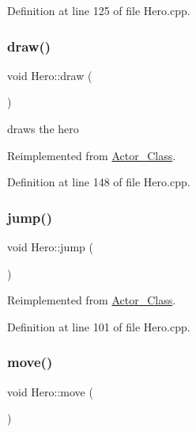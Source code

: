 Definition at line 125 of file Hero.\+cpp.

\hypertarget{class_hero_abc9f2dece1e3757ba2b315a332f995c2}{}\label{class_hero_abc9f2dece1e3757ba2b315a332f995c2} 
\subsubsection{\texorpdfstring{draw()}{draw()}}
{\footnotesize\ttfamily void Hero\+::draw (\begin{DoxyParamCaption}{ }\end{DoxyParamCaption})\hspace{0.3cm}{\ttfamily [virtual]}}



draws the hero 



Reimplemented from \hyperlink{class_actor___class_ac49cd62be76b4b950ecbe155413f1b64}{Actor\+\_\+\+Class}.



Definition at line 148 of file Hero.\+cpp.

\hypertarget{class_hero_a1bee38d9164cf1ecda512cc24e81b171}{}\label{class_hero_a1bee38d9164cf1ecda512cc24e81b171} 
\subsubsection{\texorpdfstring{jump()}{jump()}}
{\footnotesize\ttfamily void Hero\+::jump (\begin{DoxyParamCaption}{ }\end{DoxyParamCaption})\hspace{0.3cm}{\ttfamily [virtual]}}



Reimplemented from \hyperlink{class_actor___class_ab33216a3ce0c856bdc16231c71ae35c2}{Actor\+\_\+\+Class}.



Definition at line 101 of file Hero.\+cpp.

\hypertarget{class_hero_a24e136aeddd49d1a7d0c068079fbab7e}{}\label{class_hero_a24e136aeddd49d1a7d0c068079fbab7e} 
\subsubsection{\texorpdfstring{move()}{move()}}
{\footnotesize\ttfamily void Hero\+::move (\begin{DoxyParamCaption}{ }\end{DoxyParamCaption})\hspace{0.3cm}{\ttfamily [virtual]}}



